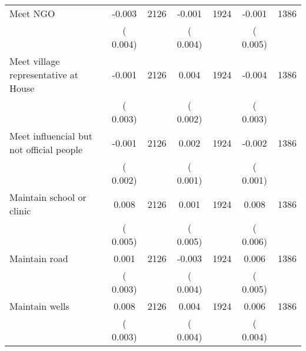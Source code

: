 \begin{tabular}{l*{6}{c}}
Meet NGO        &             -0.003      &       2126       &             -0.001      &       1924       &             -0.001      &       1386       \\
                       &       (       0.004)            &                               &       (       0.004)            &                               &       (       0.005)            &                               \\
Meet village representative at House        &             -0.001      &       2126       &              0.004      &       1924       &             -0.004      &       1386       \\
                       &       (       0.003)            &                               &       (       0.002)            &                               &       (       0.003)            &                               \\
Meet influencial but not official people        &             -0.001      &       2126       &              0.002      &       1924       &             -0.002      &       1386       \\
                       &       (       0.002)            &                               &       (       0.001)            &                               &       (       0.001)            &                               \\
Maintain school or clinic        &              0.008      &       2126       &              0.001      &       1924       &              0.008      &       1386       \\
                       &       (       0.005)            &                               &       (       0.005)            &                               &       (       0.006)            &                               \\
Maintain road        &              0.001      &       2126       &             -0.003      &       1924       &              0.006      &       1386       \\
                       &       (       0.003)            &                               &       (       0.004)            &                               &       (       0.005)            &                               \\
Maintain wells        &              0.008      &       2126       &              0.004      &       1924       &              0.006      &       1386       \\
                       &       (       0.003)            &                               &       (       0.004)            &                               &       (       0.004)            &                               \\

\end{tabular}
